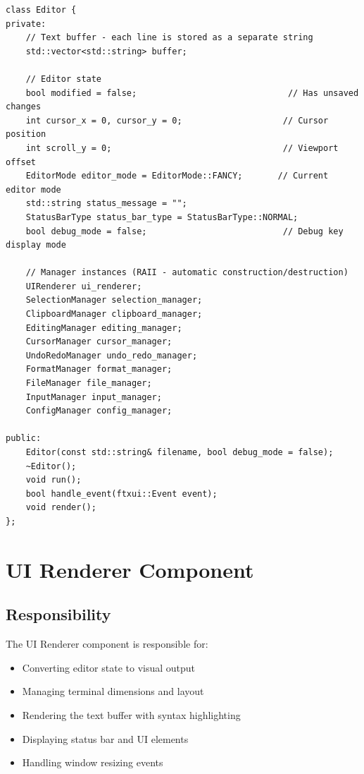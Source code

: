 \documentclass[12pt,a4paper,oneside,openany]{report}
\begin{document}
\begin{lstlisting}
class Editor {
private:
    // Text buffer - each line is stored as a separate string
    std::vector<std::string> buffer;
    
    // Editor state
    bool modified = false;                              // Has unsaved changes
    int cursor_x = 0, cursor_y = 0;                    // Cursor position
    int scroll_y = 0;                                  // Viewport offset
    EditorMode editor_mode = EditorMode::FANCY;       // Current editor mode
    std::string status_message = "";
    StatusBarType status_bar_type = StatusBarType::NORMAL;
    bool debug_mode = false;                           // Debug key display mode
    
    // Manager instances (RAII - automatic construction/destruction)
    UIRenderer ui_renderer;
    SelectionManager selection_manager;
    ClipboardManager clipboard_manager;
    EditingManager editing_manager;
    CursorManager cursor_manager;
    UndoRedoManager undo_redo_manager;
    FormatManager format_manager;
    FileManager file_manager;
    InputManager input_manager;
    ConfigManager config_manager;
    
public:
    Editor(const std::string& filename, bool debug_mode = false);
    ~Editor();
    void run();
    bool handle_event(ftxui::Event event);
    void render();
};
\end{lstlisting}

\section{UI Renderer Component}

\subsection{Responsibility}

The UI Renderer component is responsible for:

\begin{itemize}
	\item Converting editor state to visual output
	\item Managing terminal dimensions and layout
	\item Rendering the text buffer with syntax highlighting
	\item Displaying status bar and UI elements
	\item Handling window resizing events
\end{itemize}
\end{document}
